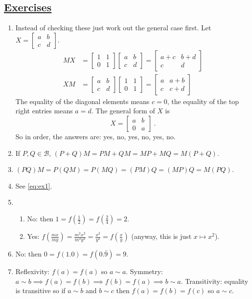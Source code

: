 \documentclass[]{article}
\begin{document}
\subsection*{\underline{Exercises}}
\begin{enumerate}
\item Instead of checking these just work out the general case first. Let $X = \begin{bmatrix}a&b\\c&d\end{bmatrix}$.
\begin{align}
MX &= \begin{bmatrix}1&1\\0&1\end{bmatrix}\begin{bmatrix}a&b\\c&d\end{bmatrix} = \begin{bmatrix}a+c&b+d\\c&d\end{bmatrix} \\
XM &= \begin{bmatrix}a&b\\c&d\end{bmatrix}\begin{bmatrix}1&1\\0&1\end{bmatrix} = \begin{bmatrix}a&a+b\\c&c+d\end{bmatrix}
\end{align}
The equality of the diagonal elements means $c=0$, the equality of the top right entries means $a=d$. The general form of $X$ is
\begin{equation}
X = \begin{bmatrix}a&b\\0&a\end{bmatrix}\ . \label{eq:ex1}
\end{equation}
So in order, the answers are: yes, no, yes, no, yes, no.
\item If $P,Q \in \mathcal{B}$, $(P+Q)M = PM + QM = MP + MQ = M(P+Q)$.
\item $(PQ)M = P(QM) = P(MQ) = (PM)Q = (MP)Q = M(PQ)$.
\item See \eqref{eq:ex1}.
\item \begin{enumerate}
\item No: then $1 = f\left(\frac{1}{2}\right) = f\left(\frac{2}{4}\right) = 2$.
\item Yes: $f\left(\frac{mx}{my}\right) = \frac{m^2x^2}{m^2y^2} = \frac{x^2}{y^2} = f\left(\frac{x}{y}\right)$ (anyway, this is just $x \mapsto x^2$).
\end{enumerate}
\item No: then $0 = f(1.0) = f(0.\bar{9}) = 9$.
\item Reflexivity: $f(a) = f(a)$ so $a \sim a$. Symmetry: $a \sim b \implies f(a) = f(b) \implies f(b) = f(a) \implies b\sim a$. Transitivity: equality is transitive so if $a \sim b$ and $b \sim c$ then $f(a) = f(b) = f(c)$ so $a \sim c$.
\end{enumerate}
\end{document}
